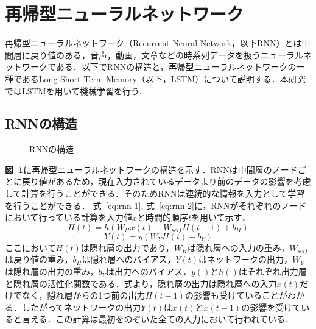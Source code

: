 \section{再帰型ニューラルネットワーク}
再帰型ニューラルネットワーク（Recurrent Neural Network，以下RNN）とは中間層に戻り値のある，音声，動画，文章などの時系列データを扱うニューラルネットワークである．以下でRNNの構造と，再帰型ニューラルネットワークの一種であるLong Short-Term Memory（以下，LSTM）について説明する．本研究ではLSTMを用いて機械学習を行う．
\subsection{RNNの構造}
\label{ssec:rel_2}

\begin{figure}[tb]
 \begin{center}
  \caption{RNNの構造}
  \label{rnn}
\end{center}
\end{figure}

\textbf{図~\ref{rnn}}に再帰型ニューラルネットワークの構造を示す．RNNは中間層のノードごとに戻り値があるため，現在入力されているデータより前のデータの影響を考慮して計算を行うことができる．そのためRNNは連続的な情報を入力として学習を行うことができる\cite{chakra16:bangla}．
式~\ref{eq:rnn-1}, 式~\ref{eq:rnn-2}に，RNNがそれぞれのノードにおいて行っている計算を入力値$x$と時間的順序$t$を用いて示す．
\begin{equation}
 H(t) = h(W_Hx(t) + W_{self}H(t-1) + b_H)
  \label{eq:rnn-1}
\end{equation}
\begin{equation}
 Y(t) = y(W_YH(t) + b_Y)
  \label{eq:rnn-2}
\end{equation}
ここにおいて$H(t)$は隠れ層の出力であり，$W_H$は隠れ層への入力の重み，$W_{self}$は戻り値の重み，$b_H$は隠れ層へのバイアス，$Y(t)$はネットワークの出力，$W_Y$は隠れ層の出力の重み，$b_Y$は出力へのバイアス，$y()$と$h()$はそれぞれ出力層と隠れ層の活性化関数である．式より，隠れ層の出力は隠れ層への入力$x(t)$だけでなく，隠れ層からの1つ前の出力$H(t-1)$の影響も受けていることがわかる．したがってネットワークの出力$Y(t)$は$x(t)$と$x(t-1)$の影響を受けていると言える．この計算は最初をのぞいた全ての入力において行われている．

